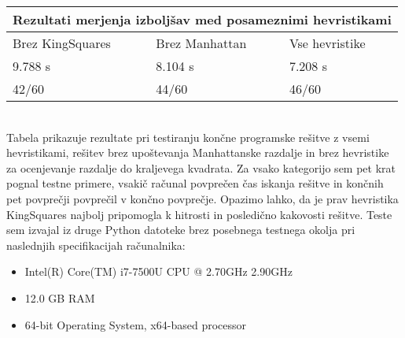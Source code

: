 \documentclass[runningheads]{llncs}
\begin{document}
{
\begin{tabular}{ |p{3cm}|p{3cm}|p{3cm}|  }
\hline
\multicolumn{3}{|c|}{Rezultati merjenja izboljšav med posameznimi hevristikami} \\
\hline
Brez KingSquares & Brez Manhattan & Vse hevristike \\
\hline
9.788 s & 8.104 s & 7.208 s \\
42/60 & 44/60 & 46/60 \\
\hline
\end{tabular}
}
\\
Tabela prikazuje rezultate pri testiranju končne programske rešitve z vsemi hevristikami, rešitev brez upoštevanja Manhattanske razdalje in brez hevristike za ocenjevanje razdalje do kraljevega kvadrata. Za vsako kategorijo sem pet krat pognal testne primere, vsakič računal povprečen čas iskanja rešitve in končnih pet povprečji povprečil v končno povprečje. Opazimo lahko, da je prav hevristika KingSquares najbolj pripomogla k hitrosti in posledično kakovosti rešitve. Teste sem izvajal iz druge Python datoteke brez posebnega testnega okolja pri naslednjih specifikacijah računalnika:
\begin{itemize}
  \item Intel(R) Core(TM) i7-7500U CPU @ 2.70GHz 2.90GHz
  \item 12.0 GB RAM
  \item 64-bit Operating System, x64-based processor
\end{itemize}
\pagebreak
\end{document}
